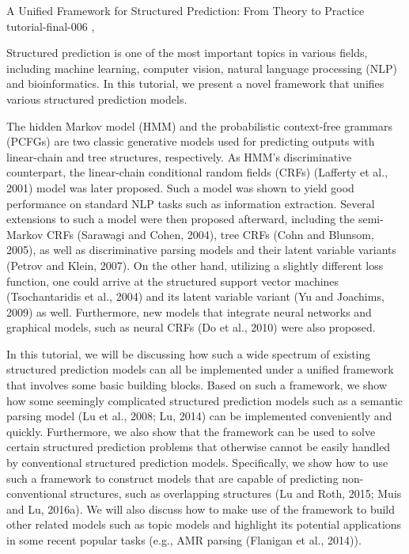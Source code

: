\begin{tutorial}
  {A Unified Framework for Structured Prediction: From Theory to Practice}
  {tutorial-final-006}
  {\daydateyear, \tutorialafternoontime}
  {\TutLocF}

Structured prediction is one of the most important topics in various fields, including machine learning, computer vision, natural language processing (NLP) and bioinformatics. In this tutorial, we present a novel framework that unifies various structured prediction models.

The hidden Markov model (HMM) and the probabilistic context-free grammars (PCFGs) are two classic generative models used for predicting outputs with linear-chain and tree structures, respectively. As HMM’s discriminative counterpart, the linear-chain conditional random fields (CRFs) (Lafferty et al., 2001) model was later proposed. Such a model was shown to yield good performance on standard NLP tasks such as information extraction. Several extensions to such a model were then proposed afterward, including the semi-Markov CRFs (Sarawagi and Cohen, 2004), tree CRFs (Cohn and Blunsom, 2005), as well as discriminative parsing models and their latent variable variants (Petrov and Klein, 2007). On the other hand, utilizing a slightly different loss function, one could arrive at the structured support vector machines (Tsochantaridis et al., 2004) and its latent variable variant (Yu and Joachims, 2009) as well. Furthermore, new models that integrate neural networks and graphical models, such as neural CRFs (Do et al., 2010) were also proposed.

In this tutorial, we will be discussing how such a wide spectrum of existing structured prediction models can all be implemented under a unified framework that involves some basic building blocks. Based on such a framework, we show how some seemingly complicated structured prediction models such as a semantic parsing model (Lu et al., 2008; Lu, 2014) can be implemented conveniently and quickly. Furthermore, we also show that the framework can be used to solve certain structured prediction problems that otherwise cannot be easily handled by conventional structured prediction models. Specifically, we show how to use such a framework to construct models that are capable of predicting non-conventional structures, such as overlapping structures (Lu and Roth, 2015; Muis and Lu, 2016a). We will also discuss how to make use of the framework to build other related models such as topic models and highlight its potential applications in some recent popular tasks (e.g., AMR parsing (Flanigan et al., 2014)).


\end{tutorial}

